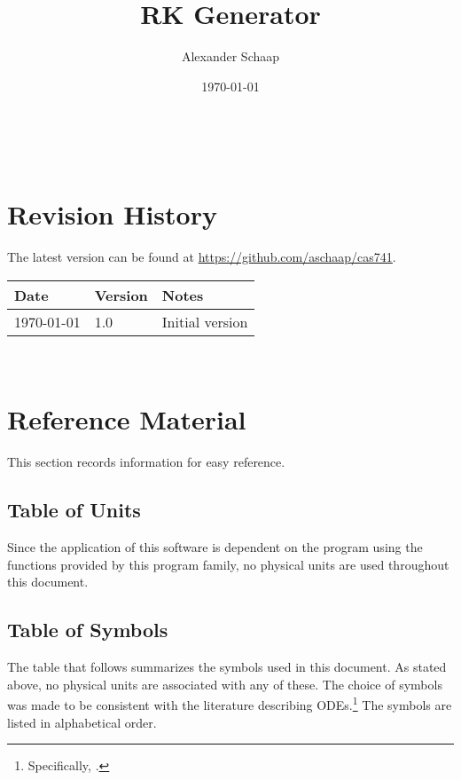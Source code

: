 \documentclass[12pt]{article}
\begin{document}
\title{RK Generator} 
\author{Alexander Schaap}
\date{\today}

\maketitle

~\newpage


\section{Revision History}
The latest version can be found at \url{https://github.com/aschaap/cas741}.\\

\noindent
\begin{tabularx}{\textwidth}{p{3cm}p{2cm}X}
\toprule {\bf Date} & {\bf Version} & {\bf Notes}\\
\midrule
\today & 1.0 & Initial version\\
\bottomrule
\end{tabularx}

~\newpage
	
\section{Reference Material}

This section records information for easy reference.

\subsection{Table of Units}

Since the application of this software is dependent on the program using the 
functions provided by this program family, no physical units are used 
throughout this document.

\subsection{Table of Symbols}\label{ssec:symbols}

The table that follows summarizes the symbols used in this document. As stated 
above, no physical units are associated with any of these.  The choice of 
symbols was made to be consistent with the 
literature describing ODEs.\footnote{Specifically, 
\cite{corless_graduate_2013}.}  The symbols are listed in alphabetical order.
\end{document}

